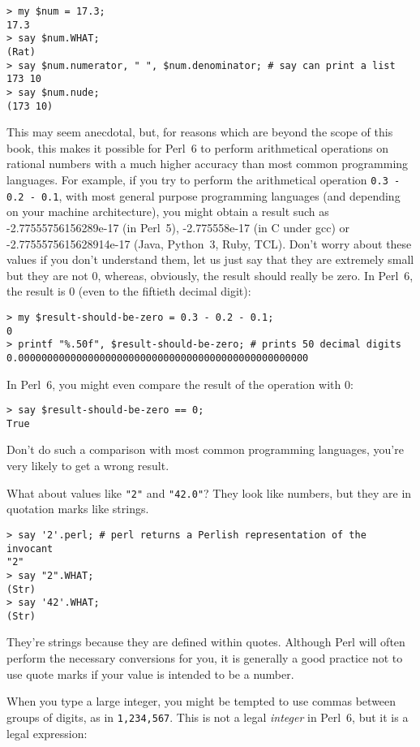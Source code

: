 \begin{verbatim}
> my $num = 17.3;
17.3
> say $num.WHAT;
(Rat)
> say $num.numerator, " ", $num.denominator; # say can print a list
173 10
> say $num.nude;
(173 10) 
\end{verbatim}
%
This may seem anecdotal, but, for reasons which are 
beyond the scope of this book, this makes it possible for Perl~6 
to perform arithmetical operations on rational numbers with 
a much higher accuracy than most common programming languages. 
For example, if you try to perform the arithmetical operation
\verb'0.3 - 0.2 - 0.1', with most general purpose programming languages 
(and depending on your machine architecture), you 
might obtain a result such as -2.77555756156289e-17 (in Perl~5), 
-2.775558e-17 (in C under gcc) or -2.7755575615628914e-17 
(Java, Python~3, Ruby, TCL). Don't worry about these values if you 
don't understand them, let us just say that they  are 
extremely small but they are not 0, whereas,  
obviously, the result should really be zero. In Perl~6, 
the result is 0 (even to the fiftieth decimal digit):
\begin{verbatim}
> my $result-should-be-zero = 0.3 - 0.2 - 0.1;
0
> printf "%.50f", $result-should-be-zero; # prints 50 decimal digits
0.00000000000000000000000000000000000000000000000000
\end{verbatim}
%
In Perl~6, you might even compare the result of the operation with 0:
\begin{verbatim}
> say $result-should-be-zero == 0;
True
\end{verbatim}
%
Don't do such a comparison with most common programming 
languages, you're very likely to get a wrong result.

What about values like \verb'"2"' and \verb'"42.0"'?
They look like numbers, but they are in quotation marks like
strings.

\begin{verbatim}
> say '2'.perl; # perl returns a Perlish representation of the invocant
"2"
> say "2".WHAT;
(Str)
> say '42'.WHAT;
(Str)
\end{verbatim}
%
They're strings because they are defined within quotes. Although 
Perl will often perform the necessary conversions for you, it 
is generally a good practice not to use quote marks if your value 
is intended to be a number.

When you type a large integer, you might be tempted to use commas
between groups of digits, as in {\tt 1,234,567}.  This is not a
legal {\em integer} in Perl~6, but it is a legal expression:

